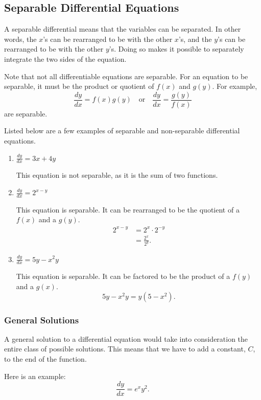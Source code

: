 \documentclass[12pt]{article}
\begin{document}
\subsection{Separable Differential Equations}
A separable differential means that the variables can be separated. In other words, the $x$'s can be rearranged to be with the other $x$'s, and the $y$'s can be rearranged to be with the other $y$'s. Doing so makes it possible to separately integrate the two sides of the equation.

Note that not all differentiable equations are separable. For an equation to be separable, it must be the product or quotient of $f(x)$ and $g(y)$. For example,
\[ \frac{dy}{dx} = f(x) g(y) \quad \text{or} \quad \frac{dy}{dx} = \frac{g(y)}{f(x)} \]
are separable.

Listed below are a few examples of separable and non-separable differential equations.
\begin{enumerate}
    \item $\frac{dy}{dx} = 3x + 4y$

          This equation is not separable, as it is the sum of two functions.
          \bigskip

    \item $\frac{dy}{dx} = 2^{x-y}$

          This equation is separable. It can be rearranged to be the quotient of a $f(x)$ and a $g(y)$.
          \begin{align*}
              2^{x-y} & = 2^x \cdot 2^{-y} \\
                      & = \frac{2^x}{2^y}.
          \end{align*}

    \item $\frac{dy}{dx} = 5y - x^2 y$

          This equation is separable. It can be factored to be the product of a $f(y)$ and a $g(x)$.
          \[ 5y - x^2 y = y(5-x^2). \]
\end{enumerate}

\subsubsection{General Solutions}
A general solution to a differential equation would take into consideration the entire class of possible solutions. This means that we have to add a constant, $C$, to the end of the function.

\noindent Here is an example:
\[ \frac{dy}{dx} = e^x y^2. \]
\end{document}
